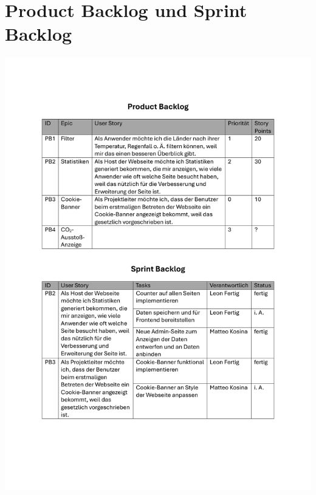 \documentclass[12pt]{article}
\begin{document}
\section{Product Backlog und Sprint Backlog}
\includegraphics[width=\textwidth]{Planungsdokumente/graphics/Backlog.pdf}
\end{document}
